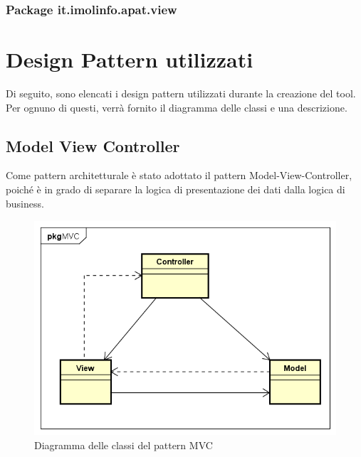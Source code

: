 \subsubsection{Package it.imolinfo.apat.view} %
\begin{namespacedesc}
\end{namespacedesc}



\section{Design Pattern utilizzati}\label{sec:design-pattern-utilizzati}
Di seguito, sono elencati i design pattern utilizzati durante la creazione del tool. Per ognuno di questi, verrà fornito il diagramma delle classi e una descrizione.
\subsection*{Model View Controller}\label{subsec:model-view-controller}
Come pattern architetturale è stato adottato il pattern Model-View-Controller, poiché è in grado di separare la logica di presentazione dei dati dalla logica di business.
\begin{figure}[H]
    \centering
    \includegraphics[width=14cm, height=8cm]{./immagini/diagrammi_uml/mvc.png}
    \caption{Diagramma delle classi del pattern MVC}\label{fig:mvc}
\end{figure}
